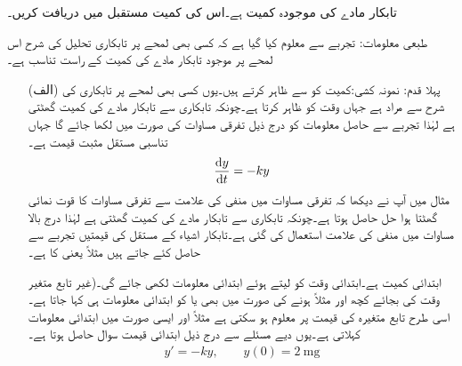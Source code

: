 تابکار  مادے کی موجودہ کمیت  ہے۔اس کی کمیت  مستقبل میں دریافت کریں۔

طبعی معلومات: تجربے سے معلوم کیا گیا ہے کہ کسی بھی لمحے پر تابکاری تحلیل کی شرح اس لمحے پر موجود تابکار مادے کی کمیت کے راست تناسب ہے۔ 
\begin{itemize}
\item[(الف)]
پہلا قدم: نمونہ کشی:\quad کمیت کو  سے ظاہر کرتے ہیں۔یوں کسی بھی لمحے پر تابکاری کی شرح سے مراد  ہے جہاں  وقت کو ظاہر کرتا ہے۔چونکہ تابکاری سے تابکار مادے کی کمیت گھٹتی ہے لہٰذا تجربے سے حاصل معلومات کو درج ذیل تفرقی مساوات کی صورت میں لکھا جائے گا جہاں تناسبی مستقل  مثبت قیمت ہے۔
\begin{align}
\frac{\dif y}{\dif t}=-ky
\end{align}
مثال  میں آپ نے دیکھا کہ تفرقی مساوات میں منفی کی علامت سے تفرقی مساوات کا قوت نمائی گھٹتا ہوا حل حاصل ہوتا ہے۔چونکہ تابکاری سے تابکار مادے کی کمیت گھٹتی ہے لہٰذا درج بالا مساوات میں منفی کی علامت استعمال کی گئی ہے۔تابکار اشیاء کے مستقل  کی قیمتیں تجربے سے حاصل کئے جاتے ہیں مثلاً  یعنی    کا  ہے۔

ابتدائی کمیت  ہے۔ابتدائی وقت کو  لیتے  ہوئے ابتدائی معلومات  لکھی  جائے گی۔(غیر تابع متغیر وقت  کی بجائے  کچھ اور مثلاً  ہونے کی صورت میں بھی  یا  کو ابتدائی معلومات ہی کہا جاتا ہے۔اسی طرح تابع متغیرہ  کی قیمت  پر معلوم ہو سکتی ہے مثلاً  اور ایسی صورت میں  ابتدائی معلومات کہلاتی ہے۔یوں دیے مسئلے سے درج ذیل ابتدائی قیمت سوال حاصل ہوتا ہے۔
\begin{align}
y'=-ky,\quad \quad y(0)=\SI{2}{\milli\gram} 
\end{align}


\end{itemize}
